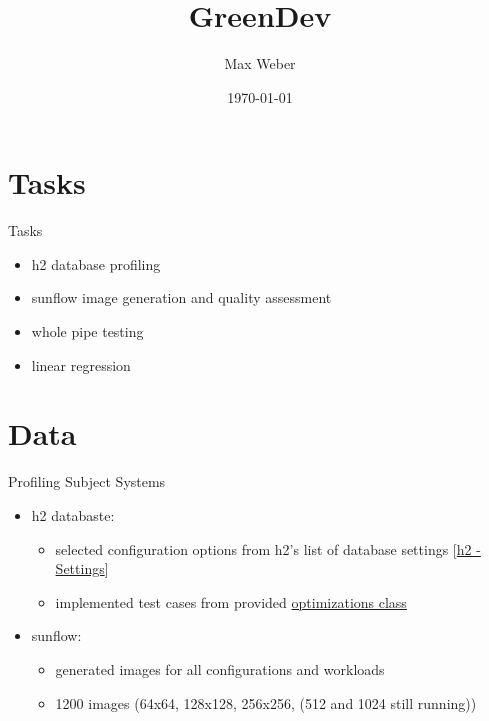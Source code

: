 \documentclass[11pt,aspectratio=169]{beamer}
\title[Green Development]{GreenDev}
\author[M. Weber]{Max Weber}
\institute[Bauhaus-Universität Weimar]{}
\date[\today]{\today}
\begin{document}

\maketitle


\section{Tasks}

\begin{frame}{Tasks}
  \begin{itemize}
    \item h2 database profiling
    \item sunflow image generation and quality assessment
    \item whole pipe testing
    \item linear regression
  \end{itemize}
\end{frame}

\section{Data}

\begin{frame}{Profiling Subject Systems}
  \begin{itemize}
    \item h2 databaste:
    \begin{itemize}
      \item selected configuration options from h2's list of database settings [\href{http://www.h2database.com/javadoc/org/h2/engine/DbSettings.html}{h2 - Settings}]
      \item implemented test cases from provided \href{../../code/subjectSystems/h2database/h2/src/test/org/h2/samples/optimizations.sql}{optimizations class} 
    \end{itemize}
    \item sunflow:
    \begin{itemize}
      \item generated images for all configurations and workloads
      \item 1200 images (64x64, 128x128, 256x256, (512 and 1024 still running))
    \end{itemize}
  \end{itemize}
\end{frame}
\end{document}
